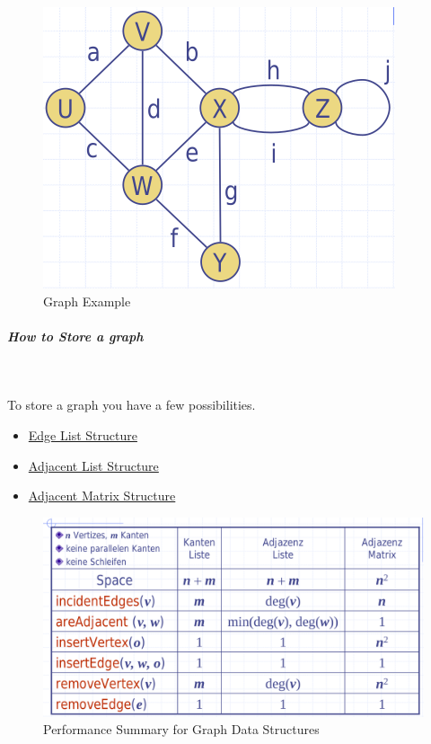 \documentclass[11pt,twoside,twocolumn,landscape]{article}
\begin{document}
\begin{figure}[htbp]
\centering
\includegraphics[width=.9\linewidth]{img/graph_example.png}
\caption{\label{fig:org96f9a85}Graph Example}
\end{figure}

\subparagraph{How to Store a graph} \
\label{sec:org39d8b57}

To store a graph you have a few possibilities.
\begin{itemize}
\item \href{../../../roam/20220201173524-edge_list_structure.org}{Edge List Structure}
\item \href{../../../roam/20220201180442-adjacent_list_structure.org}{Adjacent List Structure}
\item \href{../../../roam/20220201180955-adjacent_matrix_structure.org}{Adjacent Matrix Structure}
\end{itemize}


\begin{figure}[htbp]
\centering
\includegraphics[width=.9\linewidth]{img/graph_data_structure_summary_running_time.png}
\caption{\label{fig:org3c93c2f}Performance Summary for Graph Data Structures}
\end{figure}
\end{document}
